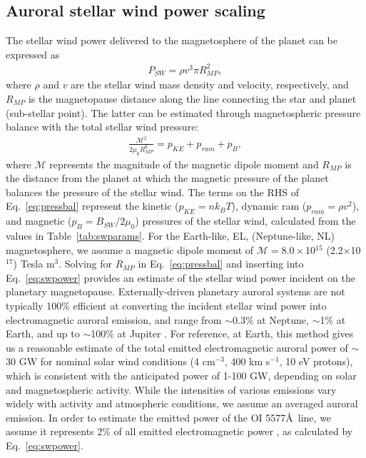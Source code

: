 \documentclass{emulateapj}
\begin{document}
\subsection{Auroral stellar wind power scaling}
\label{sec:signal_m1}

The stellar wind power delivered to the magnetosphere of the planet can be expressed as
\begin{align}
    P_{SW} = \rho v^3 \pi R_{MP}^2, \label{eq:swpower}
\end{align}
\noindent where $\rho$ and $v$ are the stellar wind mass density and velocity, respectively, and $R_{MP}$ is the magnetopause distance along the line connecting the star and planet (sub-stellar point). The latter can be estimated through magnetospheric pressure balance with the total stellar wind pressure:
\begin{align}
    \frac{\mathcal{M}^2}{2 \mu_0 R_{MP}^6} = p_{KE} + p_{ram} + p_{B}, \label{eq:pressbal}
\end{align}
where $\mathcal{M}$ represents the magnitude of the magnetic dipole moment and $R_{MP}$ is the distance from the planet at which the magnetic pressure of the planet balances the pressure of the stellar wind. The terms on the RHS of Eq.~\ref{eq:pressbal} represent the kinetic ($p_{KE}=n k_B T$), dynamic ram ($p_{ram}=\rho v^2$), and magnetic ($p_B=B_{SW}/2 \mu_0$) pressures of the stellar wind, calculated from the values in Table~\ref{tab:swparams}. 
For the Earth-like, EL, (Neptune-like, NL) magnetosphere, we assume a magnetic dipole moment of $\mathcal{M}=8.0\times$10$^{15}$ (2.2$\times$10$^{17}$) Tesla m$^3$. Solving for $R_{MP}$ in Eq.~\ref{eq:pressbal} and inserting into Eq.~\ref{eq:swpower} provides an estimate of the stellar wind power incident on the planetary magnetopause. Externally-driven planetary auroral systems are not typically 100\% efficient at converting the incident stellar wind power into electromagnetic auroral emission, and range from $\sim$0.3\% at Neptune, $\sim$1\% at Earth, and up to $\sim$100\% at Jupiter \citep[e.g.][]{Cheng1990,Bhardwaj2000}. For reference, at Earth, this method gives us a reasonable estimate of the total emitted electromagnetic auroral power of $\sim$30 GW for nominal solar wind conditions (4 cm$^{-3}$, 400 km s$^{-1}$, 10 eV protons), which is consistent with the anticipated power of 1-100 GW, depending on solar and magnetospheric activity. While the intensities of various emissions vary widely with activity and atmospheric conditions, we assume an averaged auroral emission. In order to estimate the emitted power of the OI 5577\AA\ line, we assume it represents 2\% of all emitted electromagnetic power \citep{Chamberlain1961,Kivelson1995}, as calculated by Eq.~\ref{eq:swpower}.
\end{document}
